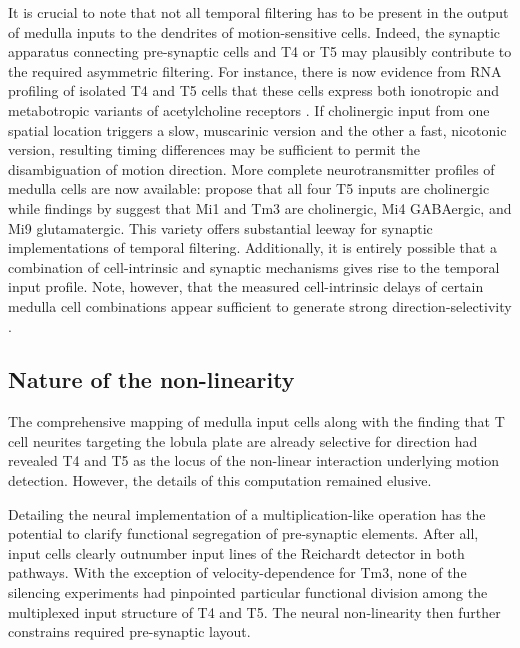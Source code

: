 It is crucial to note that not all temporal filtering has to be present in the output of medulla inputs to the dendrites of motion-sensitive cells. Indeed, the synaptic apparatus connecting pre-synaptic cells and T4 or T5 may plausibly contribute to the required asymmetric filtering. For instance, there is now evidence from RNA profiling of isolated T4 and T5 cells that these cells express both ionotropic and metabotropic variants of acetylcholine receptors \citep{Shinomiya:2014dx,Pankova:2016aa}. If cholinergic input from one spatial location triggers a slow, muscarinic version and the other a fast, nicotonic version, resulting timing differences may be sufficient to permit the disambiguation of motion direction. More complete neurotransmitter profiles of medulla cells are now available: \citet{Shinomiya:2014dx} propose that all four T5 inputs are cholinergic while findings by \citet{Takemura:2017aa} suggest that Mi1 and Tm3 are cholinergic, Mi4 GABAergic, and Mi9 glutamatergic. This variety offers substantial leeway for synaptic implementations of temporal filtering. Additionally, it is entirely possible that a combination of cell-intrinsic and synaptic mechanisms gives rise to the temporal input profile. Note, however, that the measured cell-intrinsic delays of certain medulla cell combinations appear sufficient to generate strong direction-selectivity \citep{Arenz:2017aa}.

\subsection{Nature of the non-linearity}
The comprehensive mapping of medulla input cells along with the finding that T cell neurites targeting the lobula plate are already selective for direction had revealed T4 and T5 as the locus of the non-linear interaction underlying motion detection. However, the details of this computation remained elusive.

Detailing the neural implementation of a multiplication-like operation has the potential to clarify functional segregation of pre-synaptic elements. After all, input cells clearly outnumber input lines of the Reichardt detector in both pathways. With the exception of velocity-dependence for Tm3, none of the silencing experiments had pinpointed particular functional division among the multiplexed input structure of T4 and T5. The neural non-linearity then further constrains required pre-synaptic layout.

